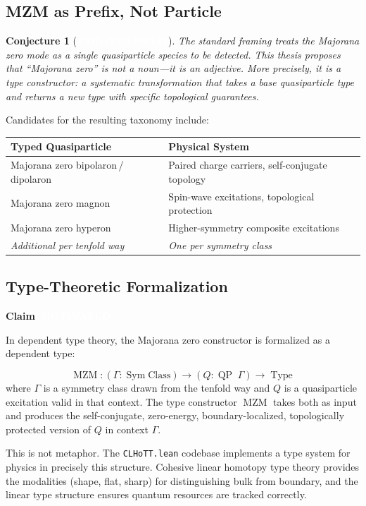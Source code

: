 \documentclass[11pt,letterpaper]{article}
\newcommand{\motivated}{\texorpdfstring{\colorbox{motivated}{\textcolor{white}{\scriptsize\textbf{\,MOTIVATED\,}}}}{ [MOTIVATED]}}
\newcommand{\conjectured}{\texorpdfstring{\colorbox{conjectured}{\textcolor{white}{\scriptsize\textbf{\,CONJECTURED\,}}}}{ [CONJECTURED]}}
\newtheorem{conjecture}[theorem]{Conjecture}
\newenvironment{claim}[1]{%
  \par\medskip\noindent\textbf{Claim} #1\quad\itshape
}{%
  \par\medskip
}
\newcommand{\MZM}{\operatorname{MZM}}
\newcommand{\Sym}{\operatorname{Sym}}
\newcommand{\QP}{\operatorname{QP}}
\newcommand{\Type}{\operatorname{Type}}
\begin{document}
\subsection{MZM as Prefix, Not Particle}

\begin{conjecture}[\conjectured]\label{conj:prefix}
The standard framing treats the Majorana zero mode as a single quasiparticle species to be detected. This thesis proposes that ``Majorana zero'' is not a noun---it is an \emph{adjective}. More precisely, it is a \emph{type constructor}: a systematic transformation that takes a base quasiparticle type and returns a new type with specific topological guarantees.
\end{conjecture}

Candidates for the resulting taxonomy include:

\begin{center}
\begin{tabular}{ll}
\toprule
\textbf{Typed Quasiparticle} & \textbf{Physical System} \\
\midrule
Majorana zero bipolaron\,/\,dipolaron & Paired charge carriers, self-conjugate topology \\
Majorana zero magnon & Spin-wave excitations, topological protection \\
Majorana zero hyperon & Higher-symmetry composite excitations \\
\emph{Additional per tenfold way} & \emph{One per symmetry class} \\
\bottomrule
\end{tabular}
\end{center}

\subsection{Type-Theoretic Formalization}

\begin{claim}{\motivated}
In dependent type theory, the Majorana zero constructor is formalized as a dependent type:
\end{claim}
\[
  \MZM : (\Gamma : \Sym\text{Class}) \to (Q : \QP\;\Gamma) \to \Type
\]
where $\Gamma$ is a symmetry class drawn from the tenfold way and $Q$ is a quasiparticle excitation valid in that context. The type constructor $\MZM$ takes both as input and produces the self-conjugate, zero-energy, boundary-localized, topologically protected version of $Q$ in context $\Gamma$.

This is not metaphor. The \texttt{CLHoTT.lean} codebase implements a type system for physics in precisely this structure. Cohesive linear homotopy type theory provides the modalities (shape, flat, sharp) for distinguishing bulk from boundary, and the linear type structure ensures quantum resources are tracked correctly.
\end{document}
